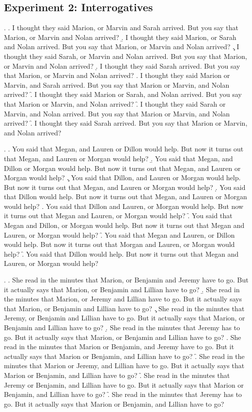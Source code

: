 \documentclass[preprint,review,12pt,authoryear,times]{elsarticle}
\begin{document}
\subsection*{Experiment 2: Interrogatives}

\setcounter{ExNo}{0}

\ex. 
\a. I thought they said Marion, or Marvin and Sarah arrived. But you say that Marion, or Marvin and Nolan arrived?
\b. I thought they said Marion, or Sarah and Nolan arrived. But you say that Marion, or Marvin and Nolan arrived?
\c. I thought they said Sarah, or Marvin and Nolan arrived. But you say that Marion, or Marvin and Nolan arrived?
\d. I thought they said Sarah arrived. But you say that Marion, or Marvin and Nolan arrived?
\e. I thought they said Marion or Marvin, and Sarah arrived. But you say that Marion or Marvin, and Nolan arrived?
\f. I thought they said Marion or Sarah, and Nolan arrived. But you say that Marion or Marvin, and Nolan arrived?
\f. I thought they said Sarah or Marvin, and Nolan arrived. But you say that Marion or Marvin, and Nolan arrived?
\f. I thought they said Sarah arrived. But you say that Marion or Marvin, and Nolan arrived?

\ex.
\a. You said that Megan, and Lauren or Dillon would help. But now it turns out that Megan, and Lauren or Morgan would help?
\b. You said that Megan, and Dillon or Morgan would help. But now it turns out that Megan, and Lauren or Morgan would help?
\c. You said that Dillon, and Lauren or Morgan would help. But now it turns out that Megan, and Lauren or Morgan would help?
\d. You said that Dillon would help. But now it turns out that Megan, and Lauren or Morgan would help?
\e. You said that Dillon and Lauren, or Morgan would help. But now it turns out that Megan and Lauren, or Morgan would help?
\f. You said that Megan and Dillon, or Morgan would help.  But now it turns out that Megan and Lauren, or Morgan would help?
\f. You said that Megan and Lauren, or Dillon would help. But now it turns out that Morgan and Lauren, or Morgan would help?
\f. You said that Dillon would help. But now it turns out that Megan and Lauren, or Morgan would help?

\ex. 
\a. She read in the minutes that Marion, or Benjamin and Jeremy have to go. But it actually says that Marion, or Benjamin and Lillian have to go?
\b. She read in the minutes that Marion, or Jeremy and Lillian have to go. But it actually says that Marion, or Benjamin and Lillian have to go?
\c. She read in the minutes that Jeremy, or Benjamin and Lillian have to go. But it actually says that Marion, or Benjamin and Lillian have to go?
\d. She read in the minutes that Jeremy has to go. But it actually says that Marion, or Benjamin and Lillian have to go?
\e. She read in the minutes that Marion or Benjamin, and Jeremy have to go. But it actually says that Marion or Benjamin, and Lillian have to go?
\f. She read in the minutes that Marion or Jeremy, and Lillian have to go. But it actually says that Marion or Benjamin, and Lillian have to go?
\f. She read in the minutes that Jeremy or Benjamin, and Lillian have to go. But it actually says that Marion or Benjamin, and Lillian have to go?
\f. She read in the minutes that Jeremy has to go. But it actually says that Marion or Benjamin, and Lillian have to go?
\end{document}
